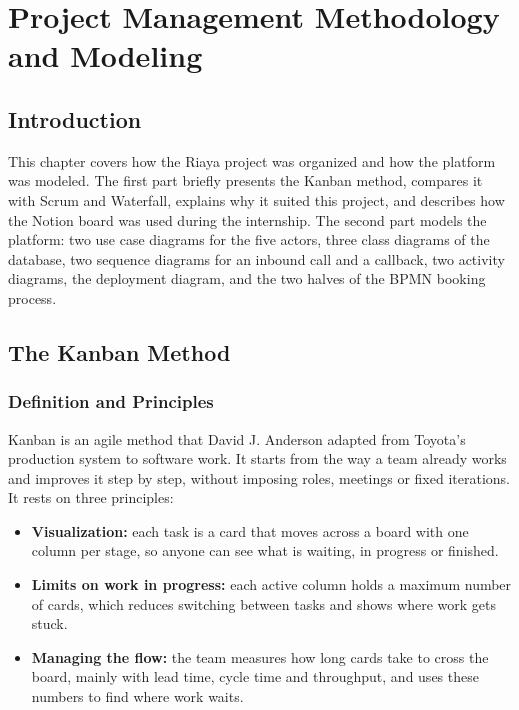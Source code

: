 \chapter{Project Management Methodology and Modeling}\label{chap:management}

\section{Introduction}
This chapter covers how the Riaya project was organized and how the platform was modeled. The first part briefly presents the Kanban method, compares it with Scrum and Waterfall, explains why it suited this project, and describes how the Notion board was used during the internship. The second part models the platform: two use case diagrams for the five actors, three class diagrams of the database, two sequence diagrams for an inbound call and a callback, two activity diagrams, the deployment diagram, and the two halves of the BPMN booking process.

\section{The Kanban Method}

\subsection{Definition and Principles}
Kanban is an agile method that David J. Anderson adapted from Toyota's production system to software work. It starts from the way a team already works and improves it step by step, without imposing roles, meetings or fixed iterations. It rests on three principles:

\begin{itemize}
    \item \textbf{Visualization:} each task is a card that moves across a board with one column per stage, so anyone can see what is waiting, in progress or finished.
    \item \textbf{Limits on work in progress:} each active column holds a maximum number of cards, which reduces switching between tasks and shows where work gets stuck.
    \item \textbf{Managing the flow:} the team measures how long cards take to cross the board, mainly with lead time, cycle time and throughput, and uses these numbers to find where work waits.
\end{itemize}

